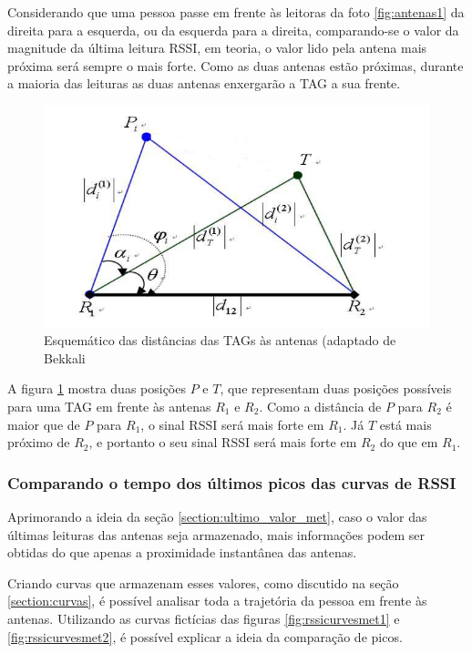  Considerando que uma pessoa passe em frente às leitoras da foto \ref{fig:antenas1} da direita para a esquerda, ou da esquerda para a direita, comparando-se o valor da magnitude da última leitura RSSI, em teoria, o valor lido pela antena mais próxima será sempre o mais forte. Como as duas antenas estão próximas, durante a maioria das leituras as duas antenas enxergarão a TAG a sua frente.
 
 \begin{figure}[H]
    \centering
    \includegraphics[width=0.8\linewidth]{figs/Metodologia/maisproxima.PNG}
    \caption{Esquemático das distâncias das TAGs às antenas (adaptado de Bekkali \cite{bekkali2007rfid}}
    \label{fig:maisproxima}
\end{figure}
 
  A figura \ref{fig:maisproxima} mostra duas posições $P$ e $T$, que representam duas posições possíveis para uma TAG em frente às antenas $R_1$ e $R_2$. Como a distância de $P$ para $R_2$ é maior que de $P$ para $R_1$, o sinal RSSI será mais forte em $R_1$. Já $T$ está mais próximo de $R_2$, e portanto o seu sinal RSSI será mais forte em $R_2$ do que em $R_1$.

 \subsubsection{Comparando o tempo dos últimos picos das curvas de RSSI} \label{section:picos_met}
 
 Aprimorando a ideia da seção \ref{section:ultimo_valor_met}, caso o valor das últimas leituras das antenas seja armazenado, mais informações podem ser obtidas do que apenas a proximidade instantânea das antenas.
 
 Criando curvas que armazenam esses valores, como discutido na seção \ref{section:curvas}, é possível analisar toda a trajetória da pessoa em frente às antenas. Utilizando as curvas fictícias das figuras \ref{fig:rssicurvesmet1} e \ref{fig:rssicurvesmet2}, é possível explicar a ideia da comparação de picos.
 

